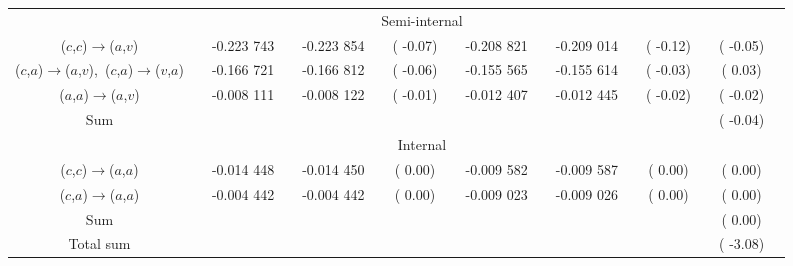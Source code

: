 \documentclass[aip,jcp,amsmath,twocolumn,floatfix,reprint,fleqn]{revtex4-1}
\begin{document}
{\begin{figure}
\begin{longtable}[!ht]{cccccccccccccccc}
                                                                  && \multicolumn{10}{c}{Semi-internal} \\                 
($c$,$c$)$\rightarrow$($a$,$v$)                                   && -0.223 743  && -0.223 854  && (  -0.07)  && -0.208 821  && -0.209 014  && (  -0.12)  && (  -0.05)\\
($c$,$a$)$\rightarrow$($a$,$v$),\ ($c$,$a$)$\rightarrow$($v$,$a$) && -0.166 721  && -0.166 812  && (  -0.06)  && -0.155 565  && -0.155 614  && (  -0.03)  && (   0.03)\\
($a$,$a$)$\rightarrow$($a$,$v$)                                   && -0.008 111  && -0.008 122  && (  -0.01)  && -0.012 407  && -0.012 445  && (  -0.02)  && (  -0.02)\\
Sum                                                               &&             &&             &&            &&             &&             &&            && (  -0.04)\\
                                                                  && \multicolumn{10}{c}{Internal} \\                      
($c$,$c$)$\rightarrow$($a$,$a$)                                   && -0.014 448  && -0.014 450  && (   0.00)  && -0.009 582  && -0.009 587  && (   0.00)  && (   0.00)\\
($c$,$a$)$\rightarrow$($a$,$a$)                                   && -0.004 442  && -0.004 442  && (   0.00)  && -0.009 023  && -0.009 026  && (   0.00)  && (   0.00)\\
Sum                                                               &&             &&             &&            &&             &&             &&            && (   0.00)\\
Total sum                                                         &&             &&             &&            &&             &&             &&            && (  -3.08)\\
\hline
\hline
\end{longtable}
\end{figure}  

}

\clearpage
\end{document}
